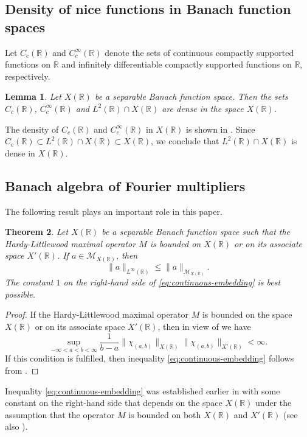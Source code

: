 \documentclass[reqno]{amsproc}
\newcommand{\cM}{\mathcal{M}}
\newcommand{\R}{\mathbb{R}}
\newtheorem{theorem}{Theorem}[section]
\newtheorem{lemma}[theorem]{Lemma}
\theoremstyle{definition}
\theoremstyle{remark}
\numberwithin{equation}{section}
\begin{document}
\subsection{Density of nice functions in Banach function spaces}
Let $C_c(\R)$ and $C_c^\infty(\R)$ denote the sets of continuous compactly
supported functions on $\R$ and infinitely differentiable compactly supported
functions on $\R$, respectively.
\begin{lemma}\label{le:density}
Let $X(\R)$ be a separable Banach function space. Then the sets $C_c(\R)$,
$C_c^\infty(\R)$ and $L^2(\R)\cap X(\R)$ are dense in the space $X(\R)$.
\end{lemma}
The density of $C_c(\R)$ and $C_c^\infty(\R)$ in $X(\R)$ is shown in 
\cite[Lemma~2.12]{KS14}. Since $C_c(\R)\subset L^2(\R)\cap X(\R)\subset X(\R)$,
we conclude that $L^2(\R)\cap X(\R)$ is dense in $X(\R)$.
\subsection{Banach algebra \boldmath{$\cM_{X(\R)}$} of Fourier multipliers}
The following result plays an important role in this paper.
\begin{theorem}
\label{th:continuous-embedding}
Let $X(\R)$ be a separable Banach function space such that the
Hardy-Littlewood maximal operator $M$ is bounded on  $X(\R)$ or
on its associate space $X'(\R)$. If $a\in\cM_{X(\R)}$, then
\begin{equation}\label{eq:continuous-embedding}
\|a\|_{L^\infty(\R)}\le\|a\|_{\cM_{X(\R)}}.
\end{equation}
The constant $1$ on the right-hand side of \eqref{eq:continuous-embedding}
is best possible.
\end{theorem}
\begin{proof}
If the Hardy-Littlewood maximal operator $M$ is bounded on the space $X(\R)$
or on its associate space $X'(\R)$, then in view of \cite[Lemma~3.2]{H12}
we have
\[
\sup_{-\infty<a<b<\infty}
\frac{1}{b-a}\|\chi_{(a,b)}\|_{X(\R)}\|\chi_{(a,b)}\|_{X'(\R)}<\infty.
\]
If this condition is fulfilled, then inequality \eqref{eq:continuous-embedding}
follows from \cite[inequality (1.2) and Corollary~4.2]{KS19}.
\end{proof}
Inequality \eqref{eq:continuous-embedding} was established earlier in
\cite[Theorem~1]{K15b} with some constant on the right-hand side that depends 
on the space $X(\R)$ under the assumption that the operator $M$ is bounded on 
both $X(\R)$ and $X'(\R)$ (see  also \cite[Theorem~2.4]{FKK-AFA}).
\end{document}

